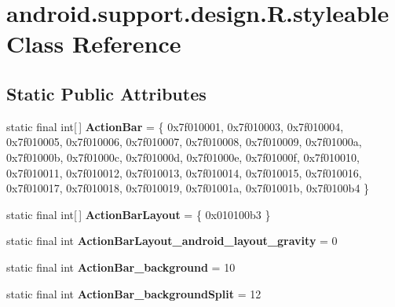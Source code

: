 \hypertarget{classandroid_1_1support_1_1design_1_1_r_1_1styleable}{}\section{android.\+support.\+design.\+R.\+styleable Class Reference}
\label{classandroid_1_1support_1_1design_1_1_r_1_1styleable}
\subsection*{Static Public Attributes}
\begin{DoxyCompactItemize}
\item 
\hypertarget{classandroid_1_1support_1_1design_1_1_r_1_1styleable_ab795220a96557d11f8c21359b95bed82}{}static final int\mbox{[}$\,$\mbox{]} {\bfseries Action\+Bar} = \{ 0x7f010001, 0x7f010003, 0x7f010004, 0x7f010005, 0x7f010006, 0x7f010007, 0x7f010008, 0x7f010009, 0x7f01000a, 0x7f01000b, 0x7f01000c, 0x7f01000d, 0x7f01000e, 0x7f01000f, 0x7f010010, 0x7f010011, 0x7f010012, 0x7f010013, 0x7f010014, 0x7f010015, 0x7f010016, 0x7f010017, 0x7f010018, 0x7f010019, 0x7f01001a, 0x7f01001b, 0x7f0100b4 \}\label{classandroid_1_1support_1_1design_1_1_r_1_1styleable_ab795220a96557d11f8c21359b95bed82}

\item 
\hypertarget{classandroid_1_1support_1_1design_1_1_r_1_1styleable_a0836ebb5f737b4f92fdf54e3c8fee963}{}static final int\mbox{[}$\,$\mbox{]} {\bfseries Action\+Bar\+Layout} = \{ 0x010100b3 \}\label{classandroid_1_1support_1_1design_1_1_r_1_1styleable_a0836ebb5f737b4f92fdf54e3c8fee963}

\item 
\hypertarget{classandroid_1_1support_1_1design_1_1_r_1_1styleable_ab454e80c9d4eb411b2c24185392fdf3a}{}static final int {\bfseries Action\+Bar\+Layout\+\_\+android\+\_\+layout\+\_\+gravity} = 0\label{classandroid_1_1support_1_1design_1_1_r_1_1styleable_ab454e80c9d4eb411b2c24185392fdf3a}

\item 
\hypertarget{classandroid_1_1support_1_1design_1_1_r_1_1styleable_a2d07ba50bce7e11b3a849eefb51eb7ea}{}static final int {\bfseries Action\+Bar\+\_\+background} = 10\label{classandroid_1_1support_1_1design_1_1_r_1_1styleable_a2d07ba50bce7e11b3a849eefb51eb7ea}

\item 
\hypertarget{classandroid_1_1support_1_1design_1_1_r_1_1styleable_aec14d1bbeebc0fe7cc5a60a04240dccf}{}static final int {\bfseries Action\+Bar\+\_\+background\+Split} = 12\label{classandroid_1_1support_1_1design_1_1_r_1_1styleable_aec14d1bbeebc0fe7cc5a60a04240dccf}


\end{DoxyCompactItemize}

